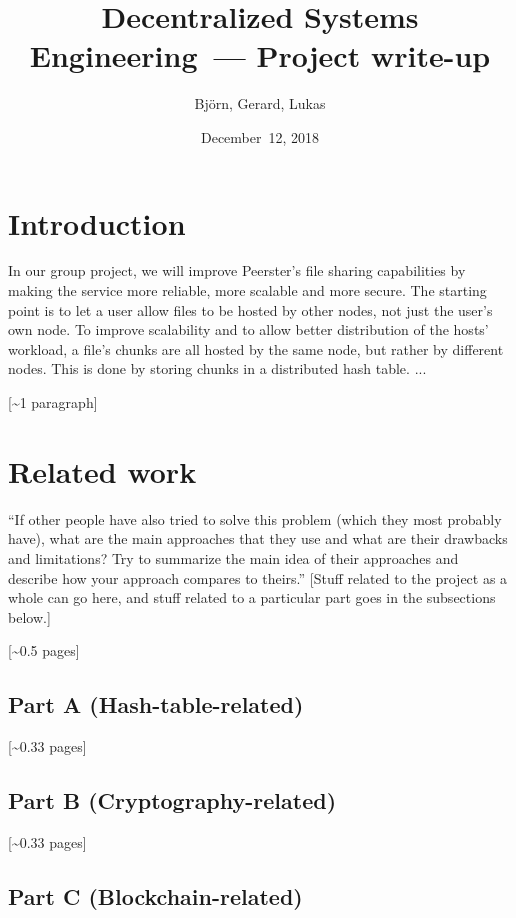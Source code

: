 \documentclass[12pt,a4paper,draft]{article}
\title{Decentralized Systems Engineering~--- Project write-up}
\author{Björn, Gerard, Lukas}
\date{December~12, 2018}
\begin{document}
\maketitle
\tableofcontents


\section{Introduction}

In our group project, we will improve Peerster's file sharing capabilities by making the service more reliable, more scalable and more secure.
The starting point is to let a user allow files to be hosted by other nodes, not just the user's own node.
To improve scalability and to allow better distribution of the hosts' workload, a file's chunks are all hosted by the same node, but rather by different nodes.
This is done by storing chunks in a distributed hash table.
...

[\textasciitilde{}1 paragraph]

\section{Related work}

``If other people have also tried to solve this problem (which they most probably have), what
are the main approaches that they use and what are their drawbacks and limitations?
Try to summarize the main idea of their approaches and describe how your approach compares to
theirs.''
[Stuff related to the project as a whole can go here, and stuff related to a particular part goes in the subsections below.]

[\textasciitilde{}0.5 pages]

\subsection{Part A (Hash-table-related)}

[\textasciitilde{}0.33 pages]

\subsection{Part B (Cryptography-related)}

[\textasciitilde{}0.33 pages]

\subsection{Part C (Blockchain-related)}
\end{document}
